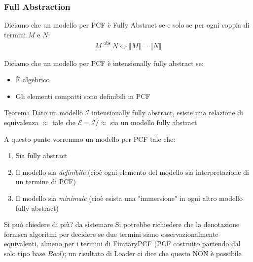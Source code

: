 \documentclass{beamer}
\newcommand{\eqobs}{\stackrel{\text{obs}}{=}}
\begin{document}
\begin{frame}
	
	\frametitle{Full Abstraction}
	
	\begin{block}{}
	Diciamo che un modello per PCF è Fully Abstract se e solo se per ogni coppia di termini $M$ e $N$:
	\begin{gather*}
		M \eqobs N \Leftrightarrow \llbracket M \rrbracket = \llbracket N \rrbracket
	\end{gather*}
	\end{block}
	
	\begin{block}{}
	Diciamo che un modello per PCF è intensionally fully abstract se:
	\begin{itemize}
		\item È algebrico
		\item Gli elementi compatti sono definibili in PCF
	\end{itemize}
	\end{block}
	
	\begin{block}{Teorema}
		Dato un modello $\mathcal{I}$ intensionally fully abstract, esiste una relazione di equivalenza $\approx$ tale che $\mathcal{E}=\mathcal{I}/ \approx$ sia un modello fully abstract
	\end{block}
	

\end{frame}


\begin{frame}
	
	A questo punto vorremmo un modello per PCF tale che:
	\begin{enumerate}
		\item Sia fully abstract
		\item Il modello sia \emph{definibile} (cioè ogni elemento del modello sia interpretazione di un termine di PCF)
		\item Il modello sia \emph{minimale} (cioè esista una "immersione" in ogni altro modello fully abstract)
	\end{enumerate}
	
	\begin{block}{Si può chiedere di più? da sistemare}
		Si potrebbe richiedere che la denotazione fornisca algoritmi per decidere se due termini siano osservazionalmente equivalenti, almeno per i termini di FinitaryPCF (PCF costruito partendo dal solo tipo base $Bool$); un risultato di Loader ci dice che questo NON è possibile
	\end{block}
	

\end{frame}
\end{document}
